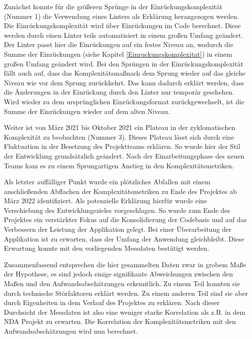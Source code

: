 Zunächst konnte für die grö\ss eren Sprünge in der Einrückungskomplexität
(Nummer 1) die Verwendung eines Linters als Erklärung herangezogen
werden. Die Einrückungskomplexität wird über Einrückungen im Code
berechnet. Diese werden durch einen Linter teils automatisiert in einem
gro\ss en Umfang geändert. Der Linter passt hier die Einrückungen auf ein
festes Niveau an, wodurch die Summe der Einrückungen (siehe Kapitel \ref{Einruckungskomplexitat}) in
einem gro\ss en Umfang geändert wird. Bei den Sprüngen in der
Einrückungskomplexität fällt auch auf, dass das Komplexitätsma\ss  nach dem
Sprung wieder auf das gleiche Niveau wie vor dem Sprung zurückkehrt. Das
kann dadurch erklärt werden, dass die Änderungen in der Einrückung durch
den Linter nur temporär geschehen. Wird wieder zu dem ursprünglichen
Einrückungsformat zurückgewechselt, ist die Summe der Einrückungen
wieder auf dem alten Niveau.

Weiter ist von März 2021 bis Oktober 2021 ein Plateau in der
zyklomatischen Komplexität zu beobachten (Nummer 3). Dieses Plateau
lässt sich durch eine Fluktuation in der Besetzung des Projektteams
erklären. So wurde hier der Stil der Entwicklung grundsätzlich geändert.
Nach der Einarbeitungsphase des neuen Teams kam es zu einem
Sprungartigen Anstieg in den Komplexitätsmetriken.

Als letzter auffälliger Punkt wurde ein plötzliches Abfallen mit einem
anschlie\ss enden Abflachen der Komplexitätsmetriken zu Ende des Projektes
ab März 2022 identifiziert. Als potenzielle Erklärung hierfür wurde eine
Verschiebung des Entwicklungszieles vorgeschlagen. So wurde zum Ende des
Projektes ein verstärkter Fokus auf die Konsolidierung der Codebasis und
auf das Verbessern der Leistung der Applikation gelegt. Bei einer
Überarbeitung der Applikation ist zu erwarten, dass der Umfang der
Anwendung gleichbleibt. Diese Erwartung konnte mit den vorliegenden
Messdaten bestätigt werden.

Zusammenfassend entsprechen die hier gesammelten Daten zwar in grobem
Ma\ss e der Hypothese, es sind jedoch einige signifikante Abweichungen
zwischen den Ma\ss en und den Aufwandsabschätzungen erkenntlich. Zu einem
Teil konnten sie durch technische Störfaktoren erklärt werden. Zu einem
anderen Teil sind sie aber durch Eigenheiten in dem Verlauf des
Projektes zu erklären. Nach dieser Durchsicht der Messdaten ist also
eine weniger starke Korrelation als z.B. in dem \ac{NDA} Projekt zu erwarten.
Die Korrelation der Komplexitätsmetriken mit den Aufwandsabschätzungen
wird nun berechnet.

